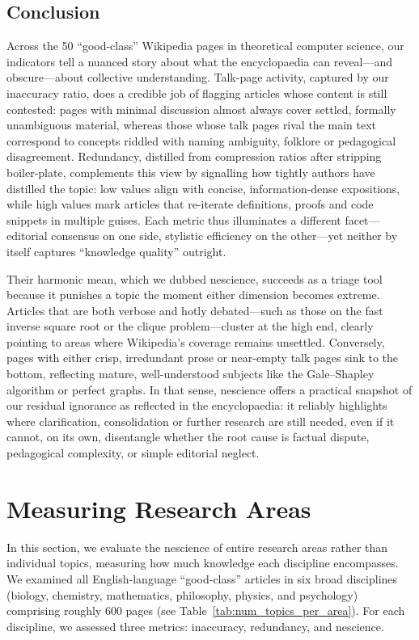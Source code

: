 \subsection{Conclusion}

Across the 50 “good-class” Wikipedia pages in theoretical computer science, our indicators tell a nuanced story about what the encyclopaedia can reveal—and obscure—about collective understanding.  Talk-page activity, captured by our inaccuracy ratio, does a credible job of flagging articles whose content is still contested: pages with minimal discussion almost always cover settled, formally unambiguous material, whereas those whose talk pages rival the main text correspond to concepts riddled with naming ambiguity, folklore or pedagogical disagreement. Redundancy, distilled from compression ratios after stripping boiler-plate, complements this view by signalling how tightly authors have distilled the topic: low values align with concise, information-dense expositions, while high values mark articles that re-iterate definitions, proofs and code snippets in multiple guises.  Each metric thus illuminates a different facet—editorial consensus on one side, stylistic efficiency on the other—yet neither by itself captures “knowledge quality” outright.

Their harmonic mean, which we dubbed nescience, succeeds as a triage tool because it punishes a topic the moment either dimension becomes extreme. Articles that are both verbose and hotly debated—such as those on the fast inverse square root or the clique problem—cluster at the high end, clearly pointing to areas where Wikipedia’s coverage remains unsettled. Conversely, pages with either crisp, irredundant prose or near-empty talk pages sink to the bottom, reflecting mature, well-understood subjects like the Gale–Shapley algorithm or perfect graphs. In that sense, nescience offers a practical snapshot of our residual ignorance as reflected in the encyclopaedia: it reliably highlights where clarification, consolidation or further research are still needed, even if it cannot, on its own, disentangle whether the root cause is factual dispute, pedagogical complexity, or simple editorial neglect.

%
%

\section{Measuring Research Areas}

In this section, we evaluate the nescience of entire research areas rather than individual topics, measuring how much knowledge each discipline encompasses. We examined all English‑language “good‑class” articles in six broad disciplines (biology, chemistry, mathematics, philosophy, physics, and psychology) comprising roughly 600 pages (see Table \ref{tab:num_topics_per_area}). For each discipline, we assessed three metrics: inaccuracy, redundancy, and nescience.

